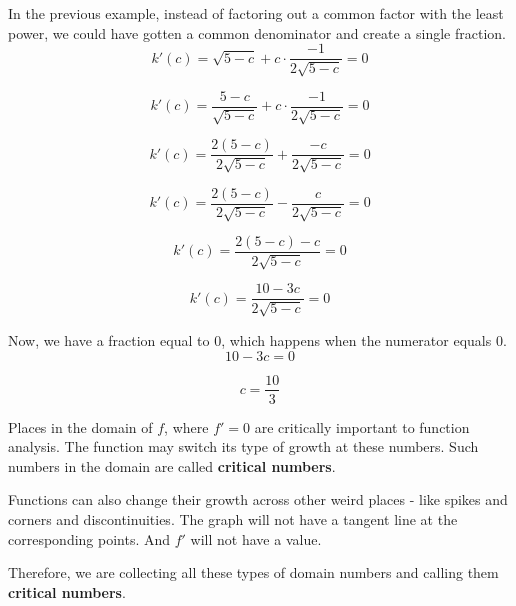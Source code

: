 \documentclass{ximera}
\begin{document}
\begin{explanation}


In the previous example, instead of factoring out a common factor with the least power, we could have gotten a common denominator and create a single fraction.\\



\[   k'(c) = \sqrt{5-c} + c \cdot \frac{-1}{2 \sqrt{5-c}}  = 0  \]


\[   k'(c) = \frac{5-c}{\sqrt{5-c}} + c \cdot \frac{-1}{2 \sqrt{5-c}}  = 0  \]


\[   k'(c) = \frac{2(5-c)}{2 \sqrt{5-c}} +  \frac{-c}{2 \sqrt{5-c}}  = 0  \]


\[   k'(c) = \frac{2(5-c)}{2 \sqrt{5-c}} -  \frac{c}{2 \sqrt{5-c}}  = 0  \]


\[   k'(c) = \frac{2(5-c)-c}{2 \sqrt{5-c}}  = 0  \]

\[   k'(c) = \frac{10 - 3c}{2 \sqrt{5-c}}   = 0  \]



Now, we have a fraction equal to $0$, which happens when the numerator equals $0$. \\

\[  10 - 3c = 0  \]

\[  c = \frac{10}{3}  \]






\end{explanation}








Places in the domain of $f$, where $f' = 0$ are critically important to function analysis. The function may switch its type of growth at these numbers.  Such numbers in the domain are called \textbf{\textcolor{purple!85!blue}{critical numbers}}.


Functions can also change their growth across other weird places - like spikes and corners and discontinuities.  The graph will not have a tangent line at the corresponding points. And $f'$ will not have a value.




Therefore, we are collecting all these types of domain numbers and calling them \textbf{\textcolor{purple!85!blue}{critical numbers}}.
\end{document}
